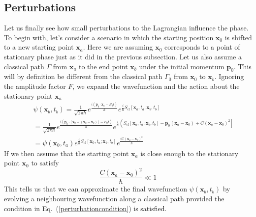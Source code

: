 \subsection{Perturbations}
Let us finally see how small perturbations to the Lagrangian influence the phase. To begin with, let's consider a scenario in which the starting position $\mathbf{x}_0$ is shifted to a new starting point $\mathbf{x}_a$.  Here we are assuming $\mathbf{x}_0$ corresponds to a point of stationary phase just as it did in the previous subsection.  Let us also assume a classical path $\Gamma$ from $\mathbf{x}_a$ to the end point $\mathbf{x}_b$  under the initial momentum $\mathbf{p}_0$. This will by definition be different from the classical path $\Gamma_0$ from $\mathbf{x}_0$ to $\mathbf{x}_b$. Ignoring the amplitude factor $F$, we expand the wavefunction and the action about the stationary point $\mathbf{x}_a$
\begin{eqnarray}
&&\psi\left(\mathbf{x}_b,t_b\right)=\frac{1}{\sqrt{2\pi\hbar}}e^{\frac{i\left(\mathbf{p}_0\cdot\mathbf{x}_a-E_0 t\right)}{\hbar}}e^{\frac{i}{\hbar}S_{\mathrm{cl}}\left[\mathbf{x}_a,t_a;\mathbf{x}_b,t_b\right]} \nonumber \\
&&=\frac{1}{\sqrt{2\pi\hbar}}e^{\frac{i\left(\mathbf{p}_0\cdot\left[\mathbf{x}_0+(\mathbf{x}_a-\mathbf{x}_0)\right]-E_0 t\right)}{\hbar}}e^{\frac{i}{\hbar}\left(S_{\mathrm{cl}}\left[\mathbf{x}_a,t_a;\mathbf{x}_b,t_b\right]-\mathbf{p}_0(\mathbf{x}_a-\mathbf{x}_0)+C(\mathbf{x}_a-\mathbf{x}_0)^2\right]} \nonumber \\
&&=\psi\left(\mathbf{x}_0,t_a\right)e^{\frac{i}{\hbar}S_{\mathrm{cl}}\left[\mathbf{x}_0,t_a;\mathbf{x}_b,t_b\right]}e^{\frac{iC\left(\mathbf{x}_a-\mathbf{x}_0\right)^2}{\hbar}}
\end{eqnarray}
If we then assume that the starting point $\mathbf{x}_a$ is close enough to the stationary point $\mathbf{x}_0$ to satisfy
\begin{equation}
\frac{C\left(\mathbf{x}_a-\mathbf{x}_0\right)^2}{\hbar}\ll 1
\label{perturbationcondition}
\end{equation}
This tells us that we can approximate the final wavefunction $\psi\left(\mathbf{x}_b,t_b\right)$ by evolving a neighbouring wavefunction along a classical path provided the condition in Eq.\ (\ref{perturbationcondition}) is satisfied.

